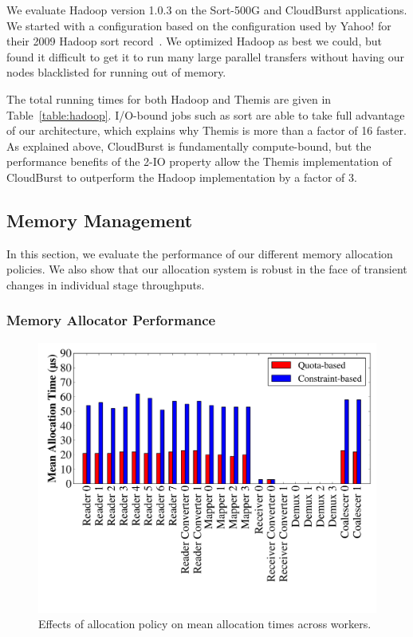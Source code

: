 We evaluate Hadoop version 1.0.3 on the Sort-500G and CloudBurst
applications. We started with a configuration based on the configuration used
by Yahoo! for their 2009 Hadoop sort record~\cite{terasort}. We optimized
Hadoop as best we could, but found it difficult to get it to run many large
parallel transfers without having our nodes blacklisted for running out of
memory.

The total running times for both Hadoop and Themis are given in
Table~\ref{table:hadoop}. I/O-bound jobs such as sort are able to take full
advantage of our architecture, which explains why Themis is more than a factor
of 16 faster. As explained above, CloudBurst is fundamentally compute-bound,
but the performance benefits of the 2-IO property allow the Themis
implementation of CloudBurst to outperform the Hadoop implementation by a
factor of 3.

\subsection{Memory Management}

In this section, we evaluate the performance of our different memory allocation
policies. We also show that our allocation system is robust in the face of
transient changes in individual stage throughputs.

\subsubsection{Memory Allocator Performance}

\begin{figure}
\includegraphics[width=\columnwidth]{themis/graphs/allocation_time_means.pdf}
\caption{\label{fig:allocation_time_means} Effects of allocation policy on mean
allocation times across workers.}
\end{figure}

